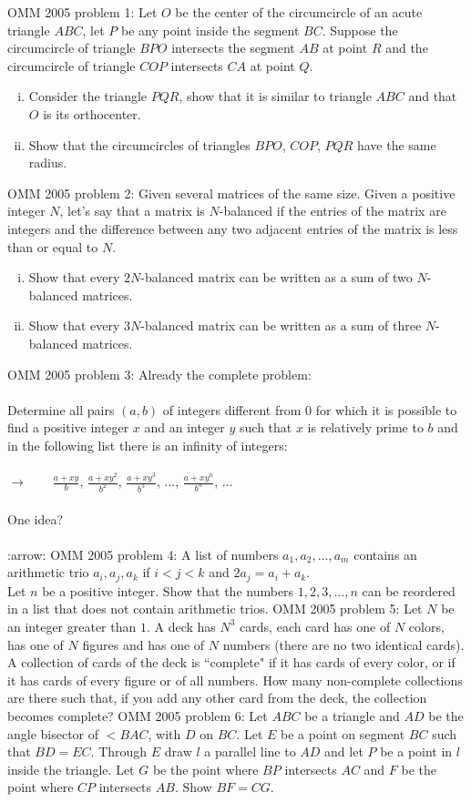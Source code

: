 OMM 2005 problem 1:  Let $O$ be the center of the circumcircle of an acute triangle $ABC$, let $P$ be any point inside the segment $BC$. Suppose the circumcircle of triangle $BPO$ intersects the segment $AB$ at point $R$ and the circumcircle of triangle $COP$ intersects $CA$ at point $Q$.
\begin{enumerate}[(i)]
  \item Consider the triangle $PQR$, show that it is similar to triangle $ABC$ and that $O$ is its orthocenter.
  \item Show that the circumcircles of triangles $BPO$, $COP$, $PQR$ have the same radius.
\end{enumerate} 
OMM 2005 problem 2:  Given several matrices of the same size. Given a positive integer $N$, let's say that a matrix is $N$-balanced if the entries of the matrix are integers and the difference between any two adjacent entries of the matrix is less than or equal to $N$.
\begin{enumerate}[(i)]
  \item Show that every $2N$-balanced matrix can be written as a sum of two $N$-balanced matrices.
  \item Show that every $3N$-balanced matrix can be written as a sum of three $N$-balanced matrices.
\end{enumerate} 
OMM 2005 problem 3:  Already the complete problem: \\\\
Determine all pairs $(a,b)$ of integers different from $0$ for which it is possible to find a positive integer $x$ and an integer $y$ such that $x$ is relatively prime to $b$ and in the following list there is an infinity of integers: \\\\
$\rightarrow\qquad\frac{a + xy}{b}$, $\frac{a + xy^2}{b^2}$, $\frac{a + xy^3}{b^3}$, $\ldots$, $\frac{a + xy^n}{b^n}$, $\ldots$ \\\\
One idea? \\\\
:arrow: 
OMM 2005 problem 4:  A list of numbers $a_1,a_2,\ldots,a_m$ contains an arithmetic trio $a_i, a_j, a_k$ if $i < j < k$ and $2a_j = a_i + a_k$. \\
Let $n$ be a positive integer. Show that the numbers $1, 2, 3, \ldots, n$ can be reordered in a list that does not contain arithmetic trios. 
OMM 2005 problem 5:  Let $N$ be an integer greater than $1$. A deck has $N^3$ cards, each card has one of $N$ colors, has one of $N$ figures and has one of $N$ numbers (there are no two identical cards). A collection of cards of the deck is ``complete" if it has cards of every color, or if it has cards of every figure or of all numbers. How many non-complete collections are there such that, if you add any other card from the deck, the collection becomes complete? 
OMM 2005 problem 6:  Let $ABC$ be a triangle and $AD$ be the angle bisector of $<BAC$, with $D$ on $BC$. Let $E$ be a point on segment $BC$ such that $BD = EC$. Through $E$ draw $l$ a parallel line to $AD$ and let $P$ be a point in $l$ inside the triangle. Let $G$ be the point where $BP$ intersects $AC$ and $F$ be the point where $CP$ intersects $AB$. Show $BF = CG$. 

